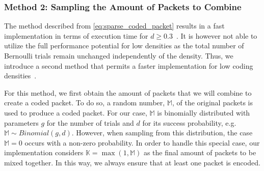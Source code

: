 \subsubsection{Method 2: Sampling the Amount of Packets to Combine}
The method described from \eqref{eq:sparse_coded_packet} results
in a fast implementation in terms of execution time for
$d \geq 0.3$~\cite{practicalview_tsnc2015}.
It is however not able to utilize the full performance potential for
low densities as the total number of Bernoulli trials remain unchanged
independently of the density.
Thus, we introduce a second method that permits a faster implementation
for low coding densities~\cite{practicalview_tsnc2015}.

For this method, we first obtain the amount of packets
that we will combine to create a coded packet. To do so, a random
number, $\mathbb{M}$, of the original packets is used to produce a
coded packet. For our case, $\mathbb{M}$ is binomially distributed
with parameters $g$ for the number of trials and $d$ for its success
probability, e.g. $\mathbb{M} \sim Binomial(g,d)$. However,
when sampling from this distribution, the case
$\mathbb{M} = 0$ occurs with a non-zero probability. In order to handle
this special case, our implementation considers
$\mathbb{K} = \max(1,\mathbb{M})$ as the final amount of packets to be
mixed together. In this way, we always ensure that at least one packet is
encoded.

